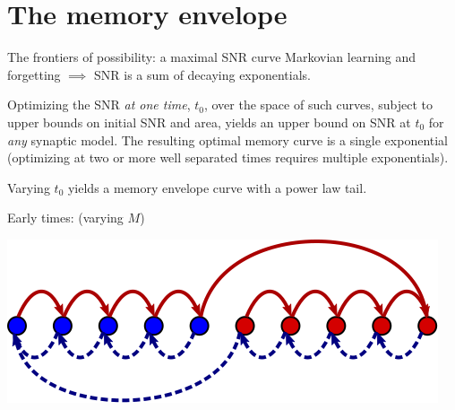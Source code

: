 \documentclass[final,hyperref={pdfpagelabels=false,bookmarks=false}]{beamer}
\begin{document}
\begin{frame}{}
\begin{columns}[t]
\begin{column}{0.33\linewidth}
\section{The memory envelope}



\begin{block}{The frontiers of possibility: a maximal SNR curve}
%
 Markovian learning and forgetting $\implies$ SNR is a sum of decaying exponentials.

 \vp Optimizing the SNR \emph{at one time}, $t_0$, over the space of such curves,
 subject to upper bounds on initial SNR and area,
 yields an upper bound on SNR at $t_0$ for \emph{any} synaptic model.
 The resulting optimal memory curve is a single exponential
 (optimizing at two or more well separated times requires multiple exponentials).

 \vp Varying $t_0$ yields a memory envelope curve with a power law tail.

\vp
\parbox[c]{0.45\linewidth}{
 \begin{center}
 \end{center}
}
\hspace{0.5cm}
\parbox[c]{0.45\linewidth}{
   Early times: (varying $M$)
   \begin{center}
     \includegraphics[width=0.7\linewidth]{diffjump.svg}
   \end{center}

}
\end{block}
\end{column}
\end{columns}
\end{frame}
\end{document}
